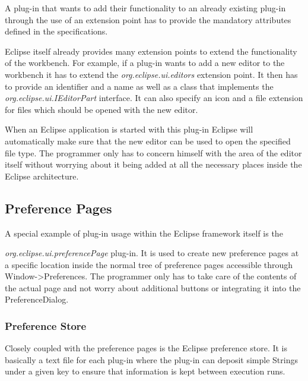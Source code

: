 A plug-in that wants to add their functionality to an already existing plug-in
through the use of an extension point has to provide the mandatory attributes defined in the 
specifications.

Eclipse itself already provides many extension points to extend the functionality of the workbench.
For example, if a plug-in wants to add a new editor to the workbench it has to extend the 
\textit{org.eclipse.ui.editors} extension point. It then has to provide an identifier and a name
as well as a class that implements the \textit{org.eclipse.ui.IEditorPart} interface. It can also specify an
icon and a file extension for files which should be opened with the new editor.

When an Eclipse application is started with this plug-in Eclipse will automatically make sure that the new editor
can be used to open the specified file type. The programmer only has to concern himself with the area of the editor
itself without worrying about it being added at all the necessary places inside the Eclipse architecture.

\subsection{Preference Pages}
\label{section:TechPreferencePage}
A special example of plug-in usage within the Eclipse framework itself is the 

\textit{org.eclipse.ui.preferencePage} plug-in. 
It is used to create new preference pages at a specific location inside the
normal tree of preference pages accessible through Window->Preferences.
The programmer only has to take care of the contents of the actual page and not worry
about additional buttons or integrating it into the PreferenceDialog.

\subsubsection{Preference Store}
\label{section:TechPreferenceStore}
Closely coupled with the preference pages is the Eclipse preference store. It is
basically a text file for each plug-in where the plug-in can deposit simple Strings
under a given key to ensure that information is kept between execution runs.